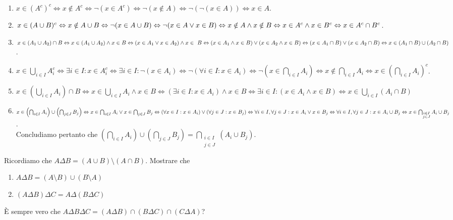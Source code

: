 \begin{enumerate}
\item $ x \in (A^c)^c \iff x \notin A^c \iff \neg (x \in A^c) \iff \neg (x \notin A) \iff \neg(\neg(x \in A)) \iff x \in A $.
\item $ x \in (A \cup B)^c \Leftrightarrow x \notin A \cup B \Leftrightarrow \neg (x \in A \cup B) \Leftrightarrow \neg(x \in A \vee x \in B) \Leftrightarrow x \notin A \wedge x \notin B \Leftrightarrow x \in A^c \wedge x \in B^c \Leftrightarrow x \in A^c \cap B^c $.
\item $ x \in (A_1 \cup A_2) \cap B \Leftrightarrow x \in (A_1 \cup A_2) \wedge x \in B \Leftrightarrow (x \in A_1 \vee x \in A_2) \wedge x \in~B \Leftrightarrow (x \in A_1 \wedge x \in B) \vee (x \in A_2 \wedge x \in B) \Leftrightarrow (x \in A_1 \cap B) \vee (x \in A_2 \cap B) \Leftrightarrow x \in (A_1 \cap B) \cup (A_2 \cap B) $.
\item $ x \in \bigcup_{i \in I} A_i ^c \iff \exists i \in I : x \in A_i^c \iff \exists i \in I : \neg (x \in A_i) \iff \neg (\forall i \in I : x \in A_i) \iff \neg \left(x \in \bigcap_{i \in I} A_i \right) \iff x \notin \bigcap_{i \in I} A_i \iff x \in \left(\bigcap_{i \in I} A_i \right)^c $.
\item $ x \in \left (\bigcup_{i \in I} A_i \right ) \cap B \iff x \in \bigcup_{i \in I} A_i \wedge x \in B \iff (\exists i \in I : x \in A_i) \wedge x \in B \iff \exists i \in I : (x \in A_i \wedge  x \in B) \iff x \in \bigcup_{i \in I} (A_i \cap B) $
\item $ x \in \left (\bigcap_{i \in I} A_i \right ) \cup \left (\bigcap_{j \in J} B_j \right ) \Leftrightarrow x \in \bigcap_{i \in I} A_i \vee x \in \bigcap_{j \in J} B_j \Leftrightarrow (\forall x \in I : x \in A_i) \vee (\forall j \in J : x \in B_j) \Leftrightarrow \forall i \in I, \forall j \in J : x \in A_i \vee x \in B_j \Leftrightarrow \forall i \in I, \forall j \in J : x \in A_i \cup B_j \Leftrightarrow x \in \bigcap_{\substack{i \in I \\ j \in J}} A_i \cup B_j $. \\
  Concludiamo pertanto che $ \left (\bigcap_{i \in I} A_i \right ) \cup \left (\bigcap_{j \in J} B_j \right ) = \bigcap_{\substack{i \in I \\ j \in J}} (A_i \cup B_j) $.
\end{enumerate}

\begin{es}
  Ricordiamo che $ A \Delta B = (A \cup B) \setminus (A \cap B) $. Mostrare che
  \begin{enumerate}
  \item $ A \Delta B = (A \setminus B) \cup (B \setminus A) $
  \item $ (A \Delta B) \Delta C = A \Delta (B \Delta C) $
  \end{enumerate}
  È sempre vero che $ A \Delta B \Delta C = (A \Delta B) \cap (B \Delta C) \cap (C \Delta A) $?
\end{es}

